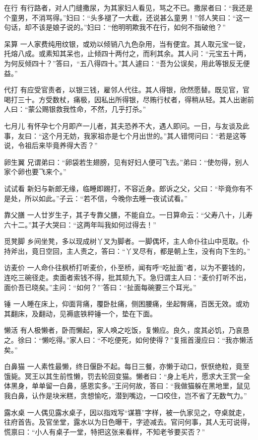 \documentclass[12pt,UTF8]{ctexbook}
\begin{document}
在行
有行路者，对人门缝撒尿，为其家妇人看见，骂之不已。撒尿者曰：“我还是个童男，不消骂得。”妇曰：“头多褪了一大截，还说甚么童男！”邻人笑曰：“这一句话，却不该是娘子说的。”妇曰：“他明明欺我不在行，如何不指破他？”

呆算
一人家费纯用纹银，或劝以倾销八九色杂用，当有便宜。其人取元宝一锭，托熔八成。或素知其呆也，止倾四十两付之，而利其余。其人问：“元宝五十两，为何反倾四十？”答曰，“五八得四十。”其人遽曰：“吾为公误矣，用此等银反无便益。”

代打
有应受官责者，以银三钱，雇邻人代往。其人得银，欣然愿替。既见官，官喝打三十。方受数杖，痛极，因私出所得银，尽贿行杖者，得稍从轻。其人出谢前人曰：“蒙公赐银救我性命，不然，几乎打杀。”

七月儿
有怀孕七个月即产一儿者，其夫恐养不大，遇人即问。一日，与友谈及此事，友曰：“这个月无妨，我家祖亦是七个月出世的。”其人错愕问曰：“若是这等说，令祖后来毕竟养得大否？”

卵生翼
兄谓弟曰：“卵袋若生翅膀，见有好妇人便可飞去。”弟曰：“使勿得，别人家个卵也要飞来个。”

试试看
新妇与新郎无缘，临睡即踢打，不容近身。郎诉之父，父曰：“毕竟你有不是处，所以如此。”子云：“若不信，今晚你去睡一夜试试看。”

靠父膳
一人廿岁生子，其子专靠父膳，不能自立。一日算命云：“父寿八十，儿寿六十二。”其子大哭曰：“这两年叫我如何过得去！”

觅凳脚
乡间坐凳，多以现成树丫叉为脚者。一脚偶坏，主人命仆往山中觅取。仆持斧出，竟日空回，主人责之，答曰：“丫叉尽有，都是朝上生，没有向下生的。”

访麦价
一人命仆往枫桥打听麦价，仆至桥，闻有呼“吃扯面”者，以为不要钱的，连吃三碗径走。卖面者索钱不得，批其颏九下。急归谓主人曰：“麦价打听不出，面价吾已晓矣。”主问：“如何？”’答曰：“扯面每碗要三个耳光。”

锤
一人睡在床上，仰面背痛，覆卧肚痛，侧困腰痛，坐起臀痛，百医无效。或劝其翻床，及翻动，见褥底铁秤锤一个，垫在下面。

懒活
有人极懒者，卧而懒起，家人唤之吃饭，复懒应。良久，度其必饥，乃哀恳之。徐曰：“懒吃得。”家人曰：“不吃便死，如何使得？”复摇首漫应曰：“我亦懒活矣。”

白鼻猫
一人素性最懒，终日偃卧不起。每日三餐，亦懒于动口，恹恹绝粒，竟至饿毙。冥王以其生前性懒，罚去轮回变猫。懒者曰：“身上毛片，愿求大王赏一全体黑身，单单留一白鼻，感恩实多。”王问何故，答曰：“我做猫躲在黑地里，鼠见我白鼻，认作是块米糕，贪想愉吃，潜到嘴边，一口咬住，岂不省了无数气力。”

露水桌
一人偶见露水桌子，因以指戏写“谋篡”字样，被一仇家见之，夺桌就走，往府首告。及官坐堂，露水以为日色曝干，字迹减去。官问何事，其人无可说得，慌禀曰：“小人有桌子一堂，特把这张来看样，不知老爷要买否？”
\end{document}

